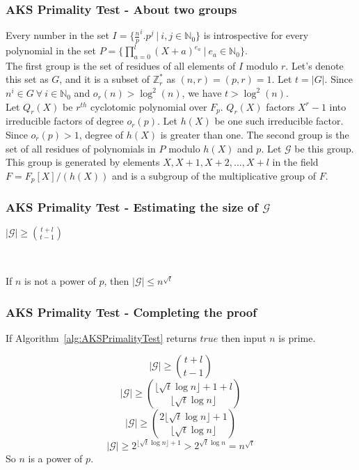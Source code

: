 \documentclass{beamer}
\begin{document}
\begin{frame}
\frametitle{AKS Primality Test - About two groups}
Every number in the set $I = \{\frac{n}{p}^i.p^j\ |\ i,j \in \mathbb{N}_0\}$ is introspective for every polynomial in the set $P = \{\prod_{a=0}^{l}{(X+a)^{e_a}}\ |\ e_a \in \mathbb{N}_0\}$.
\\[3mm]
The first group is the set of residues of all elements of $I$ modulo $r$. Let's denote this set as $G$, and it is a subset of $\mathbb{Z}_r^*$ as $(n,r) = (p,r) = 1$. Let $t = |G|$. Since $n^i \in G \ \forall \ i \in \mathbb{N}_0$ and $o_r(n) > \log^2(n)$, we have $t > \log^2(n)$.
\\[3mm]
Let $Q_r(X)$ be $r^{th}$ cyclotomic polynomial over $F_p$. $Q_r(X)$ factors $X^r-1$ into irreducible factors of degree $o_r(p)$. Let $h(X)$ be one such irreducible factor. Since $o_r(p) > 1$, degree of $h(X)$ is greater than one. The second group is the set of all residues of polynomials in $P$ modulo $h(X)$ and $p$. Let $\mathcal{G}$ be this group. This group is generated by elements $X, X + 1, X + 2, \dots, X + l$ in the field $F = F_p[X]/(h(X))$ and is a subgroup of the multiplicative group of $F$.
\end{frame}

\begin{frame}
\frametitle{AKS Primality Test - Estimating the size of $\mathcal{G}$}
\begin{lemma}
[Lenstra]\label{lemma:GLowerBound}
$|\mathcal{G}| \geq {{t+l} \choose {t-1}}$
\end{lemma}
\ 
\\[3mm]
\begin{lemma}
\label{lemma:GUpperBound}
If $n$ is not a power of $p$, then $|\mathcal{G}| \leq n^{\sqrt{t}}$
\end{lemma}
\end{frame}

\begin{frame}
\frametitle{AKS Primality Test - Completing the proof}
\begin{theorem}
If Algorithm~\ref{alg:AKSPrimalityTest} returns $true$ then input $n$ is prime.
\end{theorem}
\[|\mathcal{G}| \geq {{t+l} \choose {t-1}}\]
\[|\mathcal{G}| \geq {{{\lfloor \sqrt t \log n \rfloor} + 1 + l} \choose {\lfloor \sqrt t \log n \rfloor}}\]
\[|\mathcal{G}| \geq {{2{\lfloor \sqrt t \log n \rfloor}+1} \choose {\lfloor \sqrt t \log n \rfloor}}\]
\[|\mathcal{G}| \geq 2^{{\lfloor \sqrt t \log n \rfloor}+1} > 2^{\sqrt t \log n} = n^{\sqrt t}\]
So $n$ is a power of $p$.
\end{frame}

\end{document}
